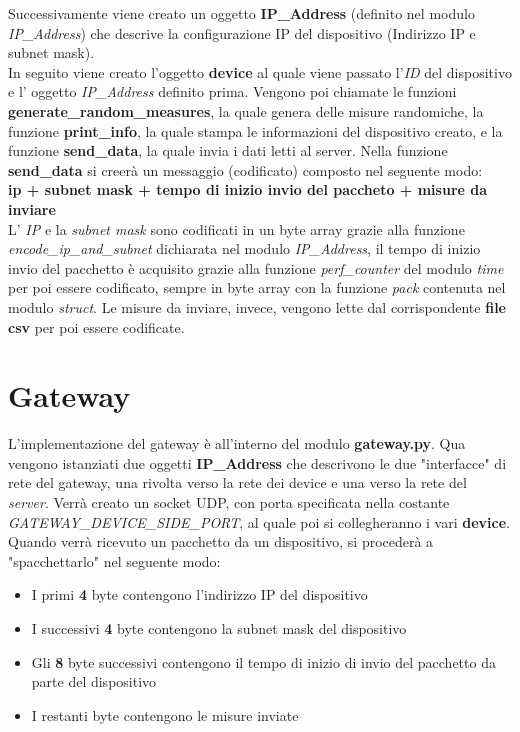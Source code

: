 \documentclass[a4paper, 14pt]{extreport}
\begin{document}
    Successivamente viene creato un oggetto \textbf{IP\_Address} (definito nel modulo \emph{IP\_Address}) 
    che descrive la configurazione IP del dispositivo (Indirizzo IP e subnet mask). \\
    In seguito viene creato l'oggetto \textbf{device} al quale viene passato l'\emph{ID} del dispositivo
    e l' oggetto \emph{IP\_Address} definito prima.
    Vengono poi chiamate le funzioni \textbf{generate\_random\_measures}, la quale genera delle misure randomiche,
    la funzione \textbf{print\_info}, la quale stampa le informazioni del dispositivo creato, e la funzione \textbf{send\_data}, la
    quale invia i dati letti al server.
    Nella funzione \textbf{send\_data} si creerà un messaggio (codificato) composto nel seguente modo: \\
    \textbf{ip + subnet mask + tempo di inizio invio del paccheto + misure da inviare}        \\
    L' \emph{IP} e la \emph{subnet mask} sono codificati in un byte array grazie alla funzione \emph{encode\_ip\_and\_subnet}
    dichiarata nel modulo \emph{IP\_Address}, il tempo di inizio invio del pacchetto è acquisito grazie alla funzione \emph{perf\_counter}
    del modulo \emph{time} per poi essere codificato, sempre in byte array con la funzione \emph{pack} contenuta nel modulo 
    \emph{struct}. Le misure da inviare, invece, vengono lette dal corrispondente \textbf{file csv} per poi essere codificate.


    \section{Gateway}
    L'implementazione del gateway è all'interno del modulo \textbf{gateway.py}.
    Qua vengono istanziati due oggetti \textbf{IP\_Address} che descrivono le due "interfacce" di rete
    del gateway, una rivolta verso la rete dei device e una verso la rete del \emph{server}.
    Verrà creato un socket UDP, con porta specificata nella costante \emph{GATEWAY\_DEVICE\_SIDE\_PORT},
    al quale poi si collegheranno i vari \textbf{device}.
    Quando verrà ricevuto un pacchetto da un dispositivo, si procederà a "spacchettarlo" nel seguente modo:

    \begin{itemize}
        \item I primi \textbf{4} byte contengono l'indirizzo IP del dispositivo
        \item I successivi \textbf{4} byte contengono la subnet mask del dispositivo
        \item Gli \textbf{8} byte successivi contengono il tempo di inizio di invio del pacchetto da parte del dispositivo
        \item I restanti byte contengono le misure inviate
    \end{itemize}
\end{document}
